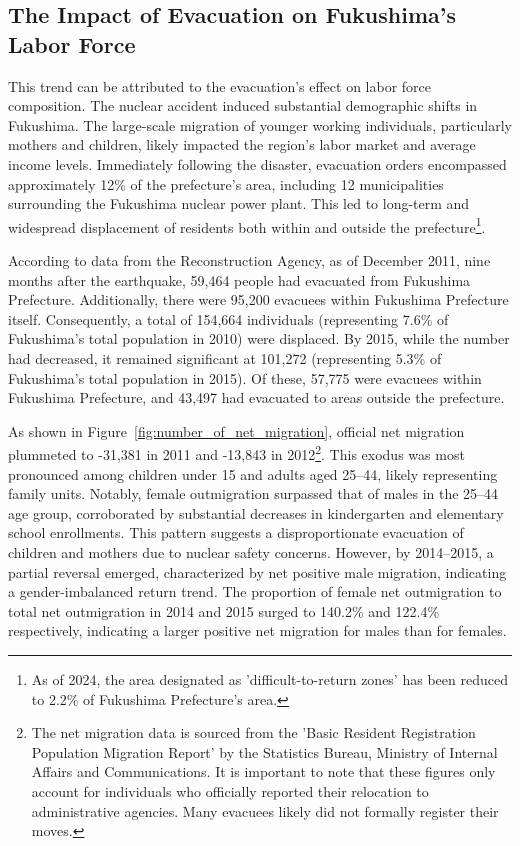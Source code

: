 \documentclass[a4paper,12pt]{article}
\begin{document}



\subsection{The Impact of Evacuation on Fukushima's Labor Force}

This trend can be attributed to the evacuation's effect on labor force composition. The nuclear accident induced substantial demographic shifts in Fukushima. The large-scale migration of younger working individuals, particularly mothers and children, likely impacted the region’s labor market and average income levels. Immediately following the disaster, evacuation orders encompassed approximately 12\% of the prefecture's area, including 12 municipalities surrounding the Fukushima nuclear power plant. This led to long-term and widespread displacement of residents both within and outside the prefecture\footnote{As of 2024, the area designated as 'difficult-to-return zones' has been reduced to 2.2\% of Fukushima Prefecture’s area.}.

According to data from the Reconstruction Agency, as of December 2011, nine months after the earthquake, 59,464 people had evacuated from Fukushima Prefecture. Additionally, there were 95,200 evacuees within Fukushima Prefecture itself. Consequently, a total of 154,664 individuals (representing 7.6\% of Fukushima's total population in 2010) were displaced. By 2015, while the number had decreased, it remained significant at 101,272 (representing 5.3\% of Fukushima's total population in 2015). Of these, 57,775 were evacuees within Fukushima Prefecture, and 43,497 had evacuated to areas outside the prefecture.

As shown in Figure~\ref{fig:number_of_net_migration}, official net migration plummeted to -31,381 in 2011 and -13,843 in 2012\footnote{The net migration data is sourced from the 'Basic Resident Registration Population Migration Report' by the Statistics Bureau, Ministry of Internal Affairs and Communications. It is important to note that these figures only account for individuals who officially reported their relocation to administrative agencies. Many evacuees likely did not formally register their moves.}. This exodus was most pronounced among children under 15 and adults aged 25--44, likely representing family units. Notably, female outmigration surpassed that of males in the 25--44 age group, corroborated by substantial decreases in kindergarten and elementary school enrollments. This pattern suggests a disproportionate evacuation of children and mothers due to nuclear safety concerns. However, by 2014--2015, a partial reversal emerged, characterized by net positive male migration, indicating a gender-imbalanced return trend. The proportion of female net outmigration to total net outmigration in 2014 and 2015 surged to 140.2\% and 122.4\% respectively, indicating a larger positive net migration for males than for females.
\end{document}
